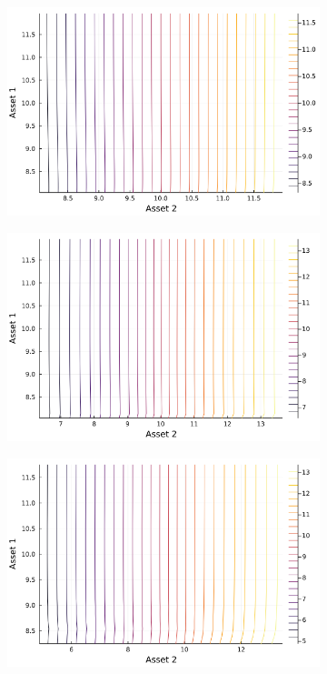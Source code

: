 \documentclass{article}
\begin{document}
\begin{figure}
    \centering
    \begin{subfigure}{0.4\textwidth}
        \includegraphics[width=\textwidth]{../plots/params/baseline/p2.png}
        \end{subfigure}
    \begin{subfigure}{0.4\textwidth}
        \includegraphics[width=\textwidth]{../plots/params/a2-mean-shift/p2.png}
    \end{subfigure}
    \begin{subfigure}{0.4\textwidth}
        \includegraphics[width=\textwidth]{../plots/params/a2-meanvar-shift/p2.png}

\end{subfigure}
\end{figure}
\end{document}

